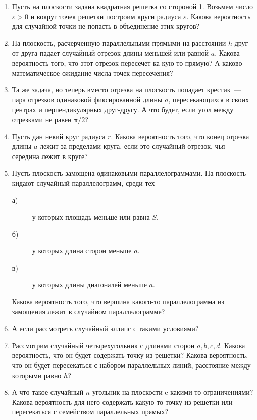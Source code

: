 \begin{enumerate}
\item Пусть на плоскости задана квадратная решетка со стороной 1. Возьмем число $\varepsilon>0$ и вокруг точек решетки построим круги радиуса $\varepsilon$. Какова вероятность для случайной точки не попасть в объединение этих кругов?

\item На плоскость, расчерченную параллельными прямыми на расстоянии $h$  друг от друга падает случайный отрезок длины меньшей или равной $a$. Какова вероятность того, что этот отрезок пересечет ка-\linebreak кую-то прямую? А каково математическое ожидание числа точек пересечения?
\item Та же задача, но теперь вместо отрезка на плоскость попадает крестик~— пара отрезков одинаковой фиксированной длины $a$, пересекающихся в своих центрах и перпендикулярных друг-другу. А что будет, если угол между отрезками не равен $\text{π}/2$?
\item Пусть дан некий круг радиуса $r$. Какова вероятность того, что конец отрезка длины $a$ лежит за пределами круга, если это случайный отрезок, чья середина лежит в круге?
\item Пусть плоскость замощена одинаковыми параллелограммами. На плоскость кидают случайный параллелограмм, среди тех 
\begin{description}
\item[а)] у которых площадь меньше или равна $S$.
\item[б)] у которых длина сторон меньше $a$.
\item[в)] у которых длины диагоналей меньше $a$.
\end{description}
Какова вероятность того, что вершина какого-то параллелограмма из замощения лежит в случайном параллелограмме?
\item А если рассмотреть случайный эллипс с такими условиями?
\item Рассмотрим случайный четырехугольник с длинами сторон $a, b, c, d$. Какова вероятность, что он будет содержать точку из решетки? Какова вероятность, что он будет пересекаться с набором параллельных линий, расстояние между которыми равно $h$?
\item А что такое случайный $n$-угольник на плоскости c какими-то ограничениями? Какова вероятность для него содержать какую-то точку из решетки или пересекаться с семейством параллельных прямых?
\end{enumerate}


